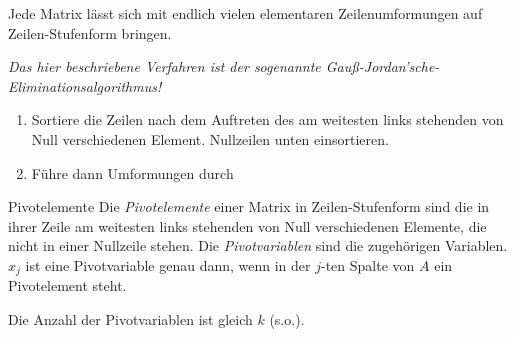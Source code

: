 \begin{satz}{}
	Jede Matrix lässt sich mit endlich vielen elementaren Zeilenumformungen auf Zeilen-Stufenform bringen.
\end{satz}
\begin{beweis}
	\textit{Das hier beschriebene Verfahren ist der sogenannte Gauß-Jordan'sche-Eliminationsalgorithmus!}
	\begin{enumerate}
		\item Sortiere die Zeilen nach dem Auftreten des am weitesten links stehenden von Null verschiedenen Element. Nullzeilen unten einsortieren.
		\item Führe dann Umformungen durch
	\end{enumerate}
\end{beweis}


\begin{definition}{Pivotelemente}
	Die \emph{Pivotelemente} einer Matrix in Zeilen-Stufenform sind die in ihrer Zeile am weitesten links stehenden von Null verschiedenen Elemente, die nicht in einer Nullzeile stehen. Die \emph{Pivotvariablen} sind die zugehörigen Variablen. $x_j$ ist eine Pivotvariable genau dann, wenn in der $j$-ten Spalte von $A$ ein Pivotelement steht.
\end{definition}

Die Anzahl der Pivotvariablen ist gleich $k$ (s.o.).
